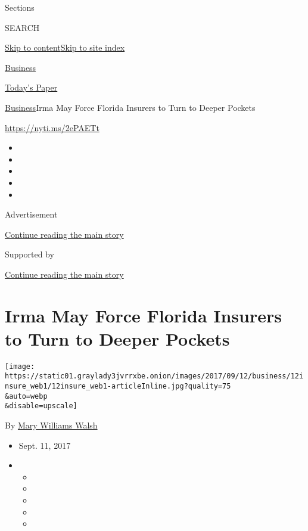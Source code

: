 Sections

SEARCH

\protect\hyperlink{site-content}{Skip to
content}\protect\hyperlink{site-index}{Skip to site index}

\href{https://www.nytimes3xbfgragh.onion/section/business}{Business}

\href{https://myaccount.nytimes3xbfgragh.onion/auth/login?response_type=cookie\&client_id=vi}{}

\href{https://www.nytimes3xbfgragh.onion/section/todayspaper}{Today's
Paper}

\href{/section/business}{Business}\textbar{}Irma May Force Florida
Insurers to Turn to Deeper Pockets

\url{https://nyti.ms/2ePAETt}

\begin{itemize}
\item
\item
\item
\item
\item
\end{itemize}

Advertisement

\protect\hyperlink{after-top}{Continue reading the main story}

Supported by

\protect\hyperlink{after-sponsor}{Continue reading the main story}

\hypertarget{irma-may-force-florida-insurers-to-turn-to-deeper-pockets}{%
\section{Irma May Force Florida Insurers to Turn to Deeper
Pockets}\label{irma-may-force-florida-insurers-to-turn-to-deeper-pockets}}

\texttt{[image: https://static01.graylady3jvrrxbe.onion/images/2017/09/12/business/12insure\_web1/12insure\_web1-articleInline.jpg?quality=75\\\&auto=webp\\\&disable=upscale]}

By \href{http://www.nytimes3xbfgragh.onion/by/mary-williams-walsh}{Mary
Williams Walsh}

\begin{itemize}
\item
  Sept. 11, 2017
\item
  \begin{itemize}
  \item
  \item
  \item
  \item
  \item
  \end{itemize}
\end{itemize}

